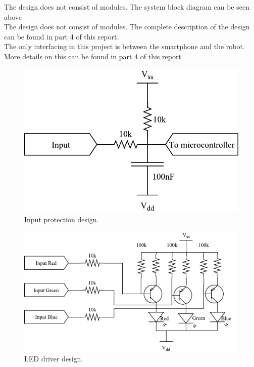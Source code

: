 The design does not consist of modules. The system block diagram can be seen above\\
The design does not consist of modules. The complete description of the design can be found in part 4 of this report.\\
The only interfacing in this project is between the smartphone and the robot. More details on this can be found in part 4 of this report\\
\begin{figure}[H]
\centering
\includegraphics[scale = 1]{pics/InputProtection.pdf}
\caption{Input protection design.}
\end{figure}
\begin{figure}[H]
\centering
\includegraphics[scale = 1]{pics/LEDDriver.pdf}
\caption{LED driver design.}
\end{figure}
